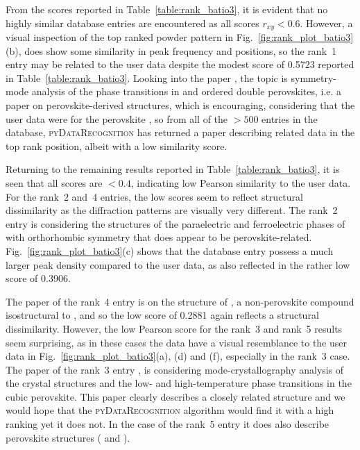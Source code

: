 \documentclass[preprint]{iucr}
\newcommand{\fig}[1]{Fig.~\ref{fig:#1}}
\newcommand{\tabl}[1]{Table~\ref{table:#1}}
\newcommand{\pydr}{\textsc{pyDataRecognition}\xspace}
\begin{document}
%
From the scores reported in \tabl{rank_batio3}, it is evident that no highly similar database entries are encountered as all scores $r_{xy}<0.6$.  However, a visual inspection of the top ranked powder pattern in \fig{rank_plot_batio3}(b), does show some similarity in peak frequency and positions, so the rank~1 entry may be related to the user data despite the modest score of 0.5723 reported in \tabl{rank_batio3}. Looking into the paper  \cite{iturbe-zabaloSymmetrymodeAnalysisPhase2013}, the topic is symmetry-mode analysis of the phase transitions in  and  ordered double perovskites, i.e. a paper on perovskite-derived structures, which is encouraging, considering that the user data were for the perovskite , so from all of the $>500$ entries in the database, \pydr has returned a paper describing related data in the top rank position, albeit with a low similarity score. 

Returning to the remaining results reported in \tabl{rank_batio3}, it is seen that all scores are $<0.4$, indicating low Pearson similarity to the user data. For the rank~2 and~4 entries, the low scores seem to reflect structural dissimilarity as the diffraction patterns are visually very different. The rank~2 entry \cite{sciauStructuresPhasesParaelectrique1999} is considering the structures of the paraelectric and ferroelectric phases of  with orthorhombic symmetry that does appear to be perovskite-related. \fig{rank_plot_batio3}(c) shows that the database entry possess a much larger peak density compared to the user data, as also reflected in the rather low score of 0.3906.

The paper of the rank~4 entry \cite{kasunicStructureLaTi2Al9O19Reanalysis2011} is on the structure of , a non-perovskite compound isostructural to , and so the low score of 0.2881 again reflects a structural dissimilarity.
However, the low Pearson score for the rank~3 and rank~5 results seem surprising, as in these cases the data have a  visual resemblance to the user data in \fig{rank_plot_batio3}(a), (d) and (f), especially in the rank~3 case. The paper of the rank~3 entry \cite{orayechModecrystallographyAnalysisCrystal2015}, is considering mode-crystallography analysis of the crystal structures and the low- and high-temperature phase transitions in the  cubic perovskite. This paper clearly describes a closely related structure and we would hope that the \pydr algorithm would find it with a high ranking yet it does not.  In the case of the rank~5 entry \cite{zhangStructuresK005Na02009} it does also describe perovskite structures ( and ).
\end{document}
